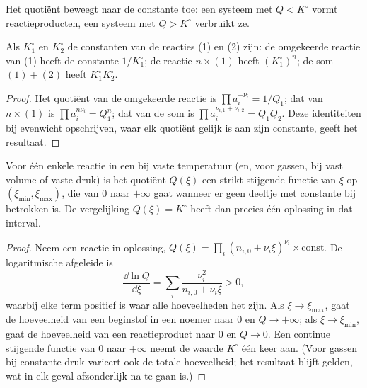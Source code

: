 \begin{omfigure}

{\small Het quotiënt beweegt naar de constante toe: een systeem met $Q <
K^\circ$ vormt reactieproducten, een systeem met $Q > K^\circ$ verbruikt
ze.}
\end{omfigure}

\begin{proposition}\label{prop:b1:extent-q-and-k:combine-k}
Als $K_1^\circ$ en $K_2^\circ$ de constanten van de reacties (1) en (2)
zijn: de omgekeerde reactie van (1) heeft de constante $1/K_1^\circ$; de
reactie $n \times
(1)$ heeft $(K_1^\circ)^n$; de som $(1) + (2)$ heeft $K_1^\circ K_2^\circ$.
\end{proposition}

\begin{proof}
Het quotiënt van de omgekeerde reactie is $\prod a_i^{-\nu_i} = 1/Q_1$;
dat van $n \times (1)$ is $\prod a_i^{n\nu_i} = Q_1^n$; dat van de som is
$\prod a_i^{\nu_{i,1} + \nu_{i,2}} = Q_1 Q_2$. Deze identiteiten bij
evenwicht opschrijven, waar elk quotiënt gelijk is aan zijn constante,
geeft het resultaat.
\end{proof}

\begin{proposition}\label{prop:b1:extent-q-and-k:q-monotone}
Voor één enkele reactie in een  bij vaste temperatuur
(en, voor gassen, bij vast volume of vaste druk) is het quotiënt $Q(\xi)$
een strikt stijgende functie van $\xi$ op $(\xi_{\min}, \xi_{\max})$, die
van 0 naar $+\infty$ gaat wanneer er geen deeltje met constante
 bij betrokken is. De vergelijking $Q(\xi) = K^\circ$ heeft dan
precies één oplossing in dat interval.
\end{proposition}

\begin{proof}
Neem een reactie in oplossing, $Q(\xi) = \prod_i (n_{i,0} + \nu_i\xi)^{\nu_i}
\times \text{const}$. De logaritmische afgeleide is
\[
  \frac{\dd \ln Q}{\dd \xi} = \sum_i \frac{\nu_i^2}{n_{i,0} + \nu_i \xi}
  > 0 ,
\]
waarbij elke term positief is waar alle hoeveelheden het zijn. Als
$\xi \to \xi_{\max}$, gaat de hoeveelheid van een beginstof in een noemer
naar 0 en $Q \to +\infty$; als $\xi
\to \xi_{\min}$, gaat de hoeveelheid van een reactieproduct naar 0 en
$Q \to 0$. Een continue stijgende functie van 0 naar $+\infty$ neemt de
waarde $K^\circ$ één keer aan. (Voor gassen bij constante druk varieert
ook de totale hoeveelheid; het resultaat blijft gelden, wat in elk geval
afzonderlijk na te gaan is.)
\end{proof}

